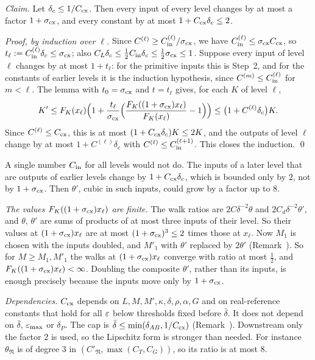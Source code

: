 \begin{detail}
\begin{step}
\emph{Claim.} Let $\delta_c\le1/C_{\rm cx}$. Then every input of every level changes by at most a factor $1+\sigma_{\rm cx}$, and every constant by at most $1+C_{\rm cx}\delta_c\le2$.

\emph{Proof, by induction over $\ell$.} Since $C^{(\ell)}\ge C^{(\ell)}_{\rm in}/\sigma_{\rm cx}$, we have $C^{(\ell)}_{\rm in}\le\sigma_{\rm cx}C_{\rm cx}$, so $t_\ell:=C^{(\ell)}_{\rm in}\delta_c\le\sigma_{\rm cx}$; also $C_L\delta_c\le\frac12C_{\rm in}\delta_c\le\frac12\sigma_{\rm cx}\le1$. Suppose every input of level $\ell$ changes by at most $1+t_\ell$: for the primitive inputs this is Step~2, and for the constants of earlier levels it is the induction hypothesis, since $C^{(m)}\le C^{(\ell)}_{\rm in}$ for $m<\ell$. The lemma with $t_0=\sigma_{\rm cx}$ and $t=t_\ell$ gives, for each $K$ of level $\ell$,
\[
K'\le F_K(x_\ell)\Big(1+\frac{t_\ell}{\sigma_{\rm cx}}\Big(\frac{F_K((1+\sigma_{\rm cx})x_\ell)}{F_K(x_\ell)}-1\Big)\Big)\le\big(1+C^{(\ell)}\delta_c\big)K .
\]
Since $C^{(\ell)}\le C_{\rm cx}$, this is at most $(1+C_{\rm cx}\delta_c)K\le2K$, and the outputs of level $\ell$ change by at most $1+C^{(\ell)}\delta_c$ with $C^{(\ell)}\le C^{(\ell+1)}_{\rm in}$. This closes the induction. \qed

A single number $C_{\rm in}$ for all levels would not do. The inputs of a later level that are outputs of earlier levels change by $1+C_{\rm cx}\delta_c$, which is bounded only by $2$, not by $1+\sigma_{\rm cx}$. Then $\theta'$, cubic in such inputs, could grow by a factor up to $8$.

\emph{The values $F_K((1+\sigma_{\rm cx})x_\ell)$ are finite.} The walk ratios are $2C\delta^{-2}\theta$ and $2C_d\delta^{-2}\theta'$, and $\theta$, $\theta'$ are sums of products of at most three inputs of their level. So their values at $(1+\sigma_{\rm cx})x_\ell$ are at most $(1+\sigma_{\rm cx})^3\le2$ times those at $x_\ell$. Now $M_1$ is chosen with the inputs doubled, and $M'_1$ with $\theta'$ replaced by $2\theta'$ (Remark~). So for $M\ge M_1,M'_1$ the walks at $(1+\sigma_{\rm cx})x_\ell$ converge with ratio at most $\frac12$, and $F_K((1+\sigma_{\rm cx})x_\ell)<\infty$. Doubling the composite $\theta'$, rather than its inputs, is enough precisely because the inputs move only by $1+\sigma_{\rm cx}$.

\emph{Dependencies.} $C_{\rm cx}$ depends on $L,M,M',\kappa,\delta,\rho,\alpha,G$ and on real-reference constants that hold for all $\varepsilon$ below thresholds fixed before $\bar\delta$. It does not depend on $\bar\delta$, $\varepsilon_{\max}$ or $\delta_P$. The cap is $\bar\delta\le\min(\delta_{AB},1/C_{\rm cx})$ (Remark~). Downstream only the factor $2$ is used, so the Lipschitz form is stronger than needed. For instance $\theta_{\mathfrak N}$ is of degree $3$ in $(C'_{\mathfrak N},\max(C_T,C_G))$, so its ratio is at most $8$.
\end{step}


\end{detail}
